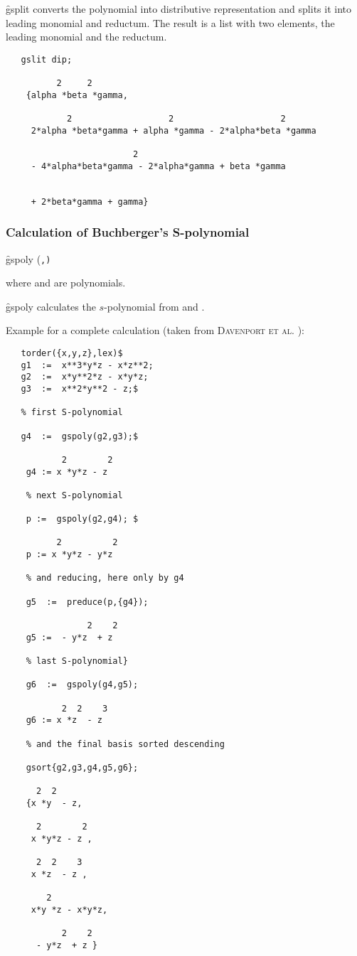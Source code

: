\f{gsplit} converts the polynomial  into distributive representation
and splits it into leading monomial and reductum. The result is a list
with two elements, the leading monomial and the reductum.

\begin{verbatim}
   gslit dip;

          2     2
    {alpha *beta *gamma,

            2                   2                     2
     2*alpha *beta*gamma + alpha *gamma - 2*alpha*beta *gamma

                         2
     - 4*alpha*beta*gamma - 2*alpha*gamma + beta *gamma


     + 2*beta*gamma + gamma}
\end{verbatim}

\subsubsection{Calculation of Buchberger's S-polynomial}
\hypertarget{operator:GSPOLY}{}
\begin{syntax}
  \f{gspoly (}\texttt{,}\texttt{)}
\end{syntax}
where  and  are polynomials.

\f{gspoly} calculates the $s$-polynomial from  and .

Example for a complete calculation (taken from \textsc{Davenport et al.}
\cite{Davenport:88a}):
\begin{verbatim}
   torder({x,y,z},lex)$
   g1  :=  x**3*y*z - x*z**2;
   g2  :=  x*y**2*z - x*y*z;
   g3  :=  x**2*y**2 - z;$

   % first S-polynomial

   g4  :=  gspoly(g2,g3);$

           2        2
    g4 := x *y*z - z

    % next S-polynomial

    p :=  gspoly(g2,g4); $

          2          2
    p := x *y*z - y*z

    % and reducing, here only by g4

    g5  :=  preduce(p,{g4});

                2    2
    g5 :=  - y*z  + z

    % last S-polynomial}

    g6  :=  gspoly(g4,g5);

           2  2    3
    g6 := x *z  - z

    % and the final basis sorted descending

    gsort{g2,g3,g4,g5,g6};

      2  2
    {x *y  - z,

      2        2
     x *y*z - z ,

      2  2    3
     x *z  - z ,

        2
     x*y *z - x*y*z,

           2    2
      - y*z  + z }
\end{verbatim}
